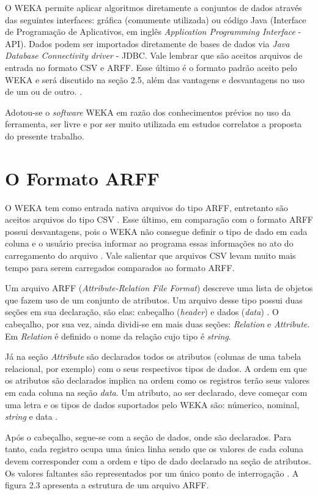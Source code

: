 \documentclass[tg]{mdtufsm}
\begin{document}
O WEKA permite aplicar algoritmos diretamente a conjuntos de dados através das seguintes interfaces: gráfica (comumente utilizada) ou código Java (Interface de Programação de Aplicativos, em inglês \textit{Application Programming Interface} - API). Dados podem ser importados diretamente de bases de dados via \textit{Java Database Connectivity driver} - JDBC. Vale lembrar que são aceitos arquivos de entrada no formato CSV e ARFF. Esse último é o formato padrão aceito pelo WEKA e será discutido na seção 2.5, além das vantagens e desvantagens no uso de um ou de outro. \cite{fischer} \cite{alcantara}.

Adotou-se o \textit{software} WEKA em razão dos conhecimentos prévios no uso da ferramenta, ser livre e por ser muito utilizada em estudos correlatos a proposta do presente trabalho. 

\section{O Formato ARFF}

O WEKA tem como entrada nativa arquivos do tipo ARFF, entretanto são aceitos arquivos do tipo CSV \cite{alcantara}. Esse último, em comparação com o formato ARFF possui desvantagens, pois o WEKA não consegue definir o tipo de dado em cada coluna e o usuário precisa informar ao programa essas informações no ato do carregamento do arquivo \cite{arff}. Vale salientar que arquivos CSV levam muito mais tempo para serem carregados comparados ao formato ARFF.

Um arquivo ARFF (\textit{Attribute-Relation File Format}) descreve uma lista de objetos que fazem uso de um conjunto de atributos. Um arquivo desse tipo possui duas seções em sua declaração, são elas: cabeçalho (\textit{header}) e dados (\textit{data}) \cite{arff}. O cabeçalho, por sua vez, ainda dividi-se em mais duas seções: \textit{Relation} e \textit{Attribute}. Em \textit{Relation} é definido o nome da relação cujo tipo é \textit{string}. 

Já na seção \textit{Attribute} são declarados todos os atributos (colunas de uma tabela relacional, por exemplo) com o seus respectivos tipos de dados. A ordem em que os atributos são declarados implica na ordem como os registros terão seus valores em cada coluna na seção \textit{data}. Um atributo, ao ser declarado, deve começar com uma letra e os tipos de dados suportados pelo WEKA são: númerico, nominal, \textit{string} e data \cite{libraga}.

Após o cabeçalho, segue-se com a seção de dados, onde são declarados. Para tanto, cada registro ocupa uma única linha sendo que os valores de cada coluna devem corresponder com a ordem e tipo de dado declarado na seção de atributos. Os valores faltantes são representados por um único ponto de interrogação \cite{arff}. A figura 2.3 apresenta a estrutura de um arquivo ARFF.
\end{document}
